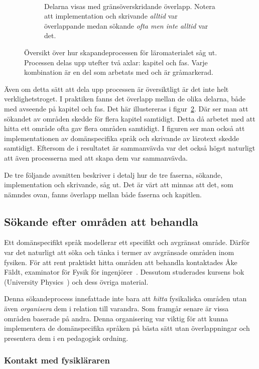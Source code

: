 \begin{figure}[tph]
\begin{subfigure}[t]{0.5\textwidth}
        \caption{Delarna visas med gränsöverskridande överlapp. Notera att
        implementation och skrivande \textit{alltid} var överlappande medan
      sökande \textit{ofta men inte alltid} var det.}~\label{fig:oversiktB}
    \end{subfigure}
    \caption{Översikt över hur skapandeprocessen för läromaterialet såg ut.
  Processen delas upp utefter två axlar: kapitel och fas. Varje kombination
  är en del som arbetats med och är gråmarkerad.}
\end{figure}

Även om detta sätt att dela upp processen är översiktligt är det inte helt
verklighetstroget. I praktiken fanns det överlapp mellan de olika delarna, både
med avseende på kapitel och fas. Det här illustereras i
figur~\ref{fig:oversiktB}. Där ser man att sökandet av områden skedde för flera
kapitel samtidigt. Detta då arbetet med att hitta ett område ofta gav flera
områden samtidigt. I figuren ser man också att implementationen av domänspecifika
språk och skrivande av lärotext skedde samtidigt. Eftersom de i resultatet är
sammanvävda var det också högst naturligt att även processerna med att skapa dem var sammanvävda.

De tre följande avsnitten beskriver i detalj hur de tre faserna, sökande,
implementation och skrivande, såg ut. Det är värt att minnas att det, som
nämndes ovan, fanns överlapp mellan både faserna och kapitlen.

\subsection{Sökande efter områden att behandla}\label{sec:valet}

Ett domänspecifikt språk modellerar ett specifikt och avgränsat område. Därför
var det naturligt att söka och tänka i termer av avgränsade områden inom
fysiken. För att rent praktiskt hitta områden att behandla kontaktades Åke
Fäldt, examinator för Fysik för ingenjörer~\cite{tif085}. Dessutom studerades kursens bok (University
Physics~\cite{UP}) och dess övriga material.

Denna sökandeprocess innefattade inte bara att \textit{hitta} fysikaliska
områden utan även \textit{organisera} dem i relation till varandra. Som framgår
senare är vissa områden baserade på andra. Denna organisering
var viktig för att kunna implementera de domänspecifika språken på bästa sätt utan överlappningar och presentera dem i en pedagogisk ordning.

\subsubsection*{Kontakt med fysikläraren}
\label{sec:kontakt_faldt}

